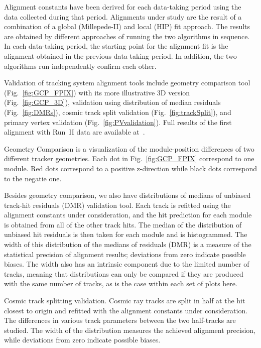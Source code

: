 Alignment constants have been derived for each data-taking period using the data collected during that period. Alignments under study are the result of a combination of a global (Millepede-II) and local (HIP) fit approach. The results are obtained by different approaches of running the two algorithms in sequence. In each data-taking period, the starting point for the alignment fit is the alignment obtained in the previous data-taking period. In addition, the two algorithms run independently confirm each other. 

Validation of tracking system alignment tools include geometry comparison tool (Fig.~\ref{fig:GCP_FPIX}) with its more illustrative 3D version (Fig.~\ref{fig:GCP_3D}), validation using distribution of median residuals (Fig.~\ref{fig:DMRs}), cosmic track split validation (Fig.~\ref{fig:trackSplit}), and primary vertex validation (Fig.~\ref{fig:PVvalidation}). Full results of the first alignment with Run~II data are available at~\cite{ref_AlApproved_twiki}.

Geometry Comparison is a visualization of the module-position differences of two different tracker geometries. Each dot in Fig.~\ref{fig:GCP_FPIX} correspond to one module. Red dots correspond to a positive z-direction while black dots correspond to the negatie one. 

Besides geometry comparison, we also have distributions of medians of unbiased track-hit residuals (DMR) validation tool. Each track is refitted using the alignment constants under consideration, and the hit prediction for each module is obtained from all of the other track hits. The median of the distribution of unbiased hit residuals is then taken for each module and is histogrammed. The width of this distribution of the medians of residuals (DMR) is a measure of the statistical precision of alignment results; deviations from zero indicate possible biases. The width also has an intrinsic component due to the limited number of tracks, meaning that distributions can only be compared if they are produced with the same number of tracks, as is the case within each set of plots here. 

Cosmic track splitting validation. Cosmic ray tracks are split in half at the hit closest to origin and refitted with the alignment constants under consideration. The differences in various track parameters between the two half-tracks are studied. The width of the distribution measures the achieved alignment precision, while deviations from zero indicate possible biases. 

